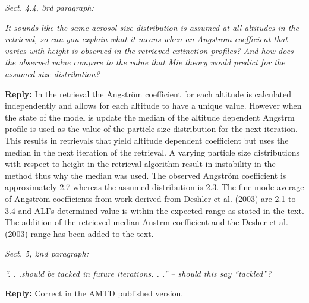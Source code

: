 \documentclass[12pt, notitlepage]{article}
\begin{document}
\textit{Sect. 4.4, 3rd paragraph:}

\textit{It sounds like the same aerosol size distribution is assumed at all altitudes in the retrieval,
so can you explain what it means when an Angstrom coefficient that varies with
height is observed in the retrieved extinction profiles? And how does the observed
value compare to the value that Mie theory would predict for the assumed size distribution?}

\textbf{Reply:} In the retrieval the Angstr\"{o}m coefficient for each altitude is calculated independently and allows for each altitude to have a unique value. However when the state of the model is update the median of the altitude dependent Angstrm profile is used as the value of the particle size distribution for the next iteration. This results in retrievals that yield altitude dependent coefficient but uses the median in the next iteration of the retrieval. A varying particle size distributions with respect to height in the retrieval algorithm result in instability in the method thus why the median was used. The observed Angstr\"{o}m coefficient is approximately 2.7 whereas the assumed distribution is 2.3. The fine mode average of Angstr\"{o}m coefficients from work derived from Deshler et al. (2003) are 2.1 to 3.4 and ALI's determined value is within the expected range as stated in the text. The addition of the retrieved median Anstrm coefficient and the Desher et al. (2003) range has been added to the text.

\hrulefill

\textit{Sect. 5, 2nd paragraph:}

\textit{``. . .should be tacked in future iterations. . .'' – should this say ``tackled''?}

\textbf{Reply:} Correct in the AMTD published version.

\hrulefill
\end{document}
